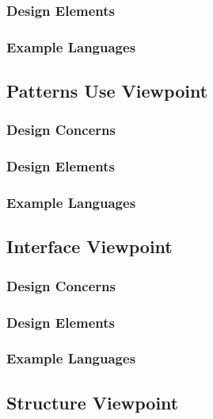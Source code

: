 \documentclass[onecolumn, draftclsnofoot,10pt, compsoc]{IEEEtran}
\begin{document}
\subsubsection{Design Elements}

\subsubsection{Example Languages}

\subsection{Patterns Use Viewpoint}
\subsubsection{Design Concerns}

\subsubsection{Design Elements}

\subsubsection{Example Languages}

\subsection{Interface Viewpoint}
\subsubsection{Design Concerns}

\subsubsection{Design Elements}

\subsubsection{Example Languages}

\subsection{Structure Viewpoint}
\end{document}
